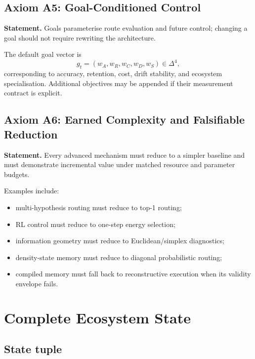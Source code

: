 \documentclass[10pt]{article}
\begin{document}
\subsection{Axiom A5: Goal-Conditioned Control}

\textbf{Statement.} Goals parameterise route evaluation and future control; changing a goal should not require rewriting the architecture.

The default goal vector is
\begin{equation}
  g_t=(w_A,w_R,w_C,w_D,w_S)\in\Delta^4,
  \label{eq:goalvector}
\end{equation}
corresponding to accuracy, retention, cost, drift stability, and ecosystem specialisation. Additional objectives may be appended if their measurement contract is explicit.

\subsection{Axiom A6: Earned Complexity and Falsifiable Reduction}

\textbf{Statement.} Every advanced mechanism must reduce to a simpler baseline and must demonstrate incremental value under matched resource and parameter budgets.

Examples include:
\begin{itemize}
  \item multi-hypothesis routing must reduce to top-1 routing;
  \item RL control must reduce to one-step energy selection;
  \item information geometry must reduce to Euclidean/simplex diagnostics;
  \item density-state memory must reduce to diagonal probabilistic routing;
  \item compiled memory must fall back to reconstructive execution when its validity envelope fails.
\end{itemize}

\section{Complete Ecosystem State}

\subsection{State tuple}
\end{document}
